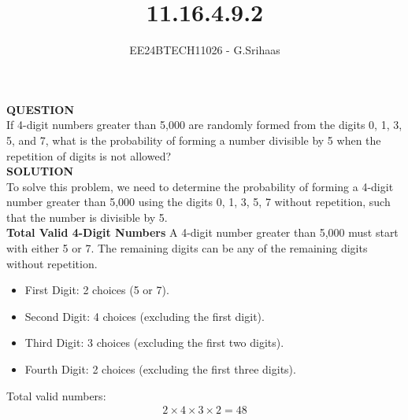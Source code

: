 \documentclass[journal]{IEEEtran}
\begin{document}

\vspace{3cm}

\title{11.16.4.9.2}
\author{EE24BTECH11026 - G.Srihaas}
{\let\newpage\relax\maketitle}

\renewcommand{\thefigure}{\theenumi}
\renewcommand{\thetable}{\theenumi}
\setlength{\intextsep}{10pt} %


\renewcommand{\thetable}{\theenumi}

\textbf{QUESTION} \\
If 4-digit numbers greater than 5,000 are randomly formed from the digits 0, 1, 3, 5, and 7, what is the probability of forming a number divisible by 5 when the repetition of digits is not allowed?\\

\textbf{SOLUTION} \\
To solve this problem, we need to determine the probability of forming a 4-digit number greater than 5,000 using the digits {0, 1, 3, 5, 7} without repetition, such that the number is divisible by 5.\\

\textbf{Total Valid 4-Digit Numbers}
A 4-digit number greater than 5,000 must start with either 5 or 7. The remaining digits can be any of the remaining digits without repetition.
\begin{itemize}
\item First Digit: 2 choices (5 or 7).
\item Second Digit: 4 choices (excluding the first digit).
\item Third Digit: 3 choices (excluding the first two digits).
\item Fourth Digit: 2 choices (excluding the first three digits).
\end{itemize}
Total valid numbers:
\begin{align}
2 \times 4 \times 3 \times 2 = 48
\end{align}
\end{document}

